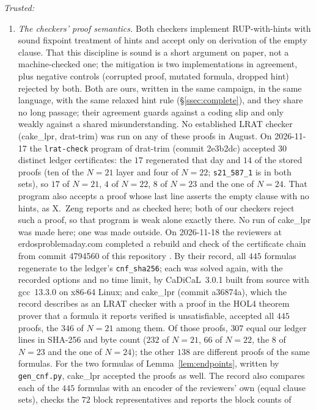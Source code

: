 \documentclass[11pt]{amsart}
\theoremstyle{plain}
\theoremstyle{definition}
\theoremstyle{remark}
\begin{document}
\emph{Trusted:}
\begin{enumerate}
\item \emph{The checkers' proof semantics.} Both checkers implement
RUP-with-hints with sound fixpoint treatment of hints and accept only on
derivation of the empty clause. That this discipline is sound is a short
argument on paper, not a machine-checked one; the mitigation is two
implementations in agreement, plus negative controls
(corrupted proof, mutated formula, dropped hint) rejected by both.
Both are ours, written in the same campaign, in the same language, with
the same relaxed hint rule (\S\ref{ssec:complete}), and they share no
long passage; their agreement guards against a coding slip and only
weakly against a shared misunderstanding. No established LRAT checker
(cake\_lpr, drat-trim) was run on any of these proofs in August. On
2026-11-17 the \texttt{lrat-check} program of drat-trim (commit
2e3b2dc) accepted $30$ distinct ledger certificates: the $17$
regenerated that day and $14$ of the stored proofs (ten of the $N=21$ layer and
four of $N=22$; \texttt{s21\_587\_1} is in both sets), so $17$ of
$N=21$, $4$ of $N=22$, $8$ of $N=23$ and the one of $N=24$. That program
also accepts a proof whose last line asserts the empty clause with no
hints, as X.~Zeng reports \cite{Zen26} and as checked here; both of our
checkers reject such a proof, so that program is weak alone exactly
there. No run of cake\_lpr was made here; one was made outside. On
2026-11-18 the reviewers at erdosproblemaday.com completed a rebuild and
check of the certificate chain from commit 4794560 of this repository
\cite{EPD26}. By their record, all $445$ formulas regenerate to the
ledger's \texttt{cnf\_sha256}; each was solved again, with the recorded
options and no time limit, by CaDiCaL~3.0.1 built from source with
gcc~13.3.0 on x86-64 Linux; and cake\_lpr (commit a36874a), which the
record describes as an LRAT checker with a proof in the HOL4 theorem
prover that a formula it reports verified is unsatisfiable, accepted all
$445$ proofs, the $346$ of $N=21$ among them. Of those proofs, $307$
equal our ledger lines in SHA-256 and byte count ($232$ of $N=21$, $66$
of $N=22$, the $8$ of $N=23$ and the one of $N=24$); the other $138$ are
different proofs of the same formulas. For the two formulas of
Lemma~\ref{lem:endpoints}, written by \texttt{gen\_cnf.py}, cake\_lpr
accepted the proofs as well. The record also compares each of the $445$
formulas with an encoder of the reviewers' own (equal clause sets),
checks the $72$ block representatives and reports the block counts of

\end{enumerate}
\end{document}
